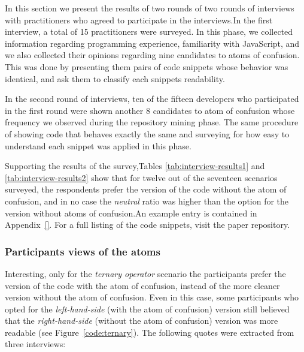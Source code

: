 In this section we present the results of two rounds of two rounds of interviews with practitioners who agreed to participate in the interviews.In the first interview, a total of 15 practitioners were surveyed. In this phase, we collected information regarding programming experience, familiarity with JavaScript, and we also collected their opinions regarding nine candidates to atoms of confusion. This was done by presenting them pairs of code snippets whose behavior was identical, and ask them to classify each snippets readability.

In the second round of interviews, ten of the fifteen developers who participated in the first round were shown another 8 candidates to atom of confusion whose frequency we observed during the repository mining phase. The same procedure of showing code that behaves exactly the same and surveying for how easy to understand each snippet was applied in this phase. 

Supporting the results of the survey,Tables \ref{tab:interview-results1} and \ref{tab:interview-results2} show that for twelve out of the seventeen scenarios surveyed, the respondents prefer the version of the code without the atom of confusion, and in no case the \emph{neutral} ratio was higher than the option for the version without atoms of confusion.An example entry is contained in Appendix~\ref{}. 
For a full listing of the code snippets, visit the paper repository. 

\subsubsection*{Participants views of the atoms} Interesting, only for the \emph{ternary operator} scenario the participants prefer the version of the code with the atom of confusion, instead of the more cleaner version without the atom of confusion. Even in this case, some participants who opted for the \emph{left-hand-side} (with the atom of confusion) version still believed that the \emph{right-hand-side} (without the atom of confusion) version was more readable (see Figure~\ref{code:ternary}). 
The following quotes were extracted from three interviews:

